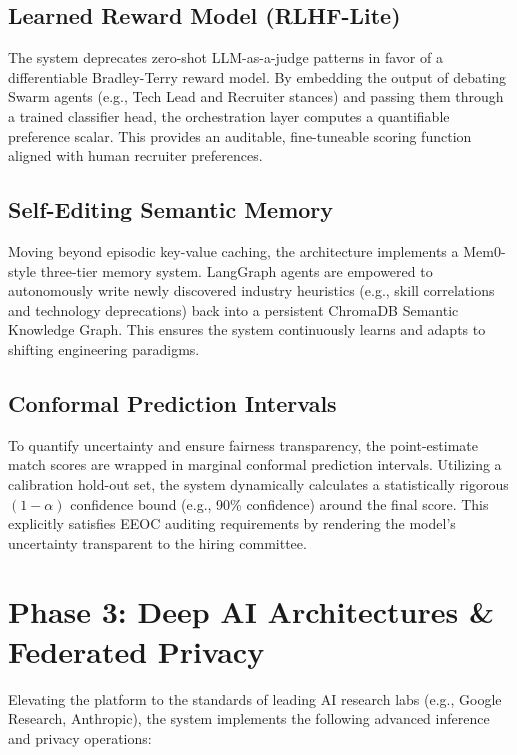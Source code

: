\documentclass[10pt,journal,compsoc]{IEEEtran}
\begin{document}
\subsection{Learned Reward Model (RLHF-Lite)}
The system deprecates zero-shot LLM-as-a-judge patterns in favor of a differentiable Bradley-Terry reward model. By embedding the output of debating Swarm agents (e.g., Tech Lead and Recruiter stances) and passing them through a trained classifier head, the orchestration layer computes a quantifiable preference scalar. This provides an auditable, fine-tuneable scoring function aligned with human recruiter preferences.

\subsection{Self-Editing Semantic Memory}
Moving beyond episodic key-value caching, the architecture implements a Mem0-style three-tier memory system. LangGraph agents are empowered to autonomously write newly discovered industry heuristics (e.g., skill correlations and technology deprecations) back into a persistent ChromaDB Semantic Knowledge Graph. This ensures the system continuously learns and adapts to shifting engineering paradigms.

\subsection{Conformal Prediction Intervals}
To quantify uncertainty and ensure fairness transparency, the point-estimate match scores are wrapped in marginal conformal prediction intervals. Utilizing a calibration hold-out set, the system dynamically calculates a statistically rigorous $(1-\alpha)$ confidence bound (e.g., 90\% confidence) around the final score. This explicitly satisfies EEOC auditing requirements by rendering the model's uncertainty transparent to the hiring committee.

\section{Phase 3: Deep AI Architectures \& Federated Privacy}
Elevating the platform to the standards of leading AI research labs (e.g., Google Research, Anthropic), the system implements the following advanced inference and privacy operations:
\end{document}
